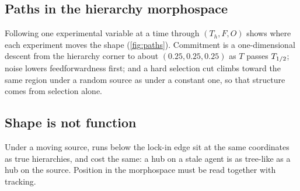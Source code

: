 \subsection{Paths in the hierarchy morphospace}
Following one experimental variable at a time through $(T_h,F,O)$ shows where each experiment moves the shape
(\cref{fig:paths}). Commitment is a one-dimensional descent from the hierarchy corner to about $(0.25,0.25,0.25)$ as $T$
passes $T_{1/2}$; noise lowers feedforwardness first; and a hard selection cut climbs toward the same region under a random
source as under a constant one, so that structure comes from selection alone.


\subsection{Shape is not function}
Under a moving source, runs below the lock-in edge sit at the same coordinates as true hierarchies, and cost the same: a
hub on a stale agent is as tree-like as a hub on the source. Position in the morphospace must be read together with
tracking.
